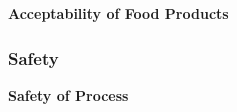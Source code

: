 \documentclass{report}
\begin{document}

\textbf{Acceptability of Food Products}






\subsubsection{Safety}


\textbf{Safety of Process}


\end{document}
